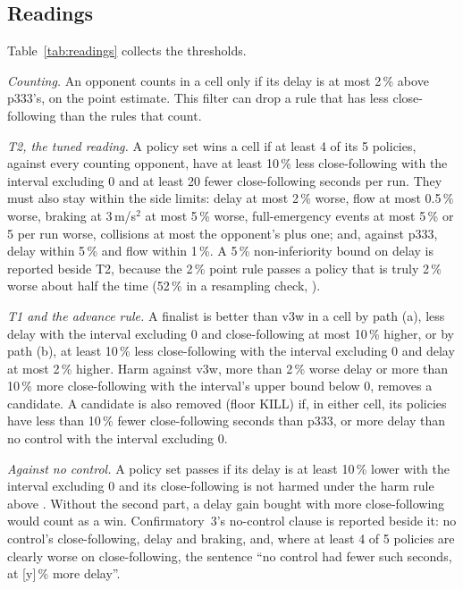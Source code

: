 \subsection{Readings}\label{sec:readings}

Table~\ref{tab:readings} collects the thresholds.

\emph{Counting.} An opponent counts in a cell only if its delay is at most 2\,\% above p333's, on the point estimate.
This filter can drop a rule that has less close-following than the rules that count.

\emph{T2, the tuned reading.} A policy set wins a cell if at least 4 of its 5 policies, against every counting opponent, have at least 10\,\% less close-following with the interval excluding 0 and at least 20 fewer close-following seconds per run.
They must also stay within the side limits: delay at most 2\,\% worse, flow at most 0.5\,\% worse, braking at 3\,m/s$^2$ at most 5\,\% worse, full-emergency events at most 5\,\% or 5 per run worse, collisions at most the opponent's plus one; and, against p333, delay within 5\,\% and flow within 1\,\%.
A 5\,\% non-inferiority bound on delay is reported beside T2, because the 2\,\% point rule passes a policy that is truly 2\,\% worse about half the time (52\,\% in a resampling check, ).

\emph{T1 and the advance rule.} A finalist is better than v3w in a cell by path (a), less delay with the interval excluding 0 and close-following at most 10\,\% higher, or by path (b), at least 10\,\% less close-following with the interval excluding 0 and delay at most 2\,\% higher.
Harm against v3w, more than 2\,\% worse delay or more than 10\,\% more close-following with the interval's upper bound below 0, removes a candidate.
A candidate is also removed (floor KILL) if, in either cell, its policies have less than 10\,\% fewer close-following seconds than p333, or more delay than no control with the interval excluding 0.

\emph{Against no control.} A policy set passes if its delay is at least 10\,\% lower with the interval excluding 0 and its close-following is not harmed under the harm rule above .
Without the second part, a delay gain bought with more close-following would count as a win.
Confirmatory~3's no-control clause is reported beside it: no control's close-following, delay and braking, and, where at least 4 of 5 policies are clearly worse on close-following, the sentence ``no control had fewer such seconds, at [y]\,\% more delay''.

